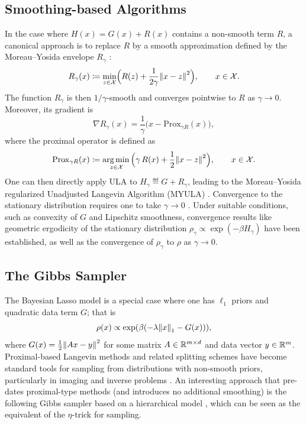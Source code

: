 \documentclass[11pt, twoside]{report}
\begin{document}
\subsection{Smoothing-based Algorithms}
In the case where $H(x) = G(x) + R(x)$ contains a non-smooth term $R$, a canonical approach is to replace $R$ by a smooth approximation defined by the Moreau--Yosida envelope $R_\gamma$ \cite{pereyra2016proximal}:
$$
R_\gamma(x)\eqdef \min_{z\in \mathcal X} \Bigl(R(z) + \frac{1}{2\gamma}\norm{x-z}^2\Bigr),\qquad x\in \mathcal X.
$$
The function $R_\gamma$ is then $1/\gamma$-smooth and converges pointwise to $R$ as $\gamma \to 0$. 
Moreover, its gradient is
$$
\nabla R_\gamma(x) = \frac{1}{\gamma}\bigl( x - \mathrm{Prox}_{\gamma R}(x)\bigr),
$$
where the proximal operator is defined as
\begin{align*}
    \mathrm{Prox}_{\gamma R}(x) \eqdef \argmin_{z\in \mathcal X} \Bigl(\gamma\, R(x) + \frac12 \norm{x-z}^2\Bigr),\qquad x\in \mathcal X.
\end{align*}
One can then directly apply ULA to $H_\gamma\eqdef G + R_\gamma$, leading to the Moreau--Yosida regularized Unadjusted Langevin Algorithm (MYULA) \cite{durmus2018efficient}. Convergence to the stationary distribution requires one to take $\gamma \to 0$ \cite{durmus2018efficient}. Under suitable conditions, such as convexity of $G$ and Lipschitz smoothness, convergence results like geometric ergodicity of the stationary distribution   $\rho_\gamma \propto \exp(-\beta H_\gamma)$ have been established, as well as the convergence of $\rho_\gamma$ to $\rho$ as $\gamma \to 0$.
\subsection{The Gibbs Sampler}
The Bayesian Lasso model is a special case where one has $\ell_1$ priors and quadratic data term $G$; that is
$$
\rho(x) \propto \exp\pa{ \beta \pa{-\lambda \norm{x}_1 - G(x)} },
$$
where $G(x) = \frac12\norm{Ax-y}^2$
for some matrix $A\in \mathbb{R}^{m\times d}$ and data vector $y\in \mathbb{R}^m$. Proximal-based Langevin methods and related splitting schemes have become standard tools for sampling from distributions with non-smooth priors, particularly in imaging and inverse problems \cite{pereyra2016proximal, durmus2018efficient, proxalgs}. An interesting approach that  pre-dates  proximal-type methods (and introduces no additional smoothing) is the following Gibbs sampler based on a hierarchical model \cite{park2008Bayesian}, which can be seen as the equivalent of the $\eta$-trick for sampling.
\end{document}
